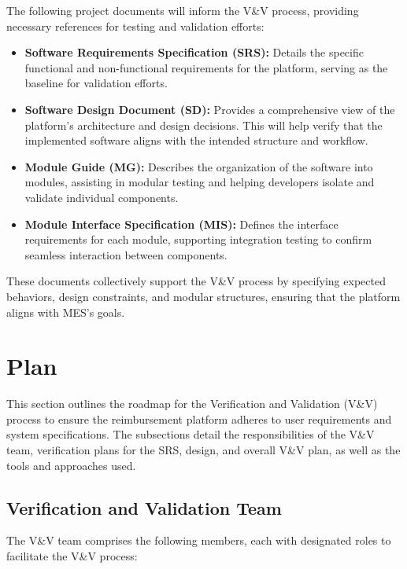 \documentclass[12pt, titlepage]{article}
\begin{document}
The following project documents will inform the V\&V process, providing necessary references for testing and validation efforts:

\begin{itemize}
    \item \textbf{Software Requirements Specification (SRS):} Details the specific functional and non-functional requirements for the platform, serving as the baseline for validation efforts.
    \item \textbf{Software Design Document (SD):} Provides a comprehensive view of the platform's architecture and design decisions. This will help verify that the implemented software aligns with the intended structure and workflow.
    \item \textbf{Module Guide (MG):} Describes the organization of the software into modules, assisting in modular testing and helping developers isolate and validate individual components.
    \item \textbf{Module Interface Specification (MIS):} Defines the interface requirements for each module, supporting integration testing to confirm seamless interaction between components.
\end{itemize}

These documents collectively support the V\&V process by specifying expected behaviors, design constraints, and modular structures, ensuring that the platform aligns with MES's goals.


\section{Plan}
This section outlines the roadmap for the Verification and Validation (V\&V) process to ensure the reimbursement platform adheres to user requirements and system specifications. The subsections detail the responsibilities of the V\&V team, verification plans for the SRS, design, and overall V\&V plan, as well as the tools and approaches used.

\subsection{Verification and Validation Team}
The V\&V team comprises the following members, each with designated roles to facilitate the V\&V process:
\end{document}
